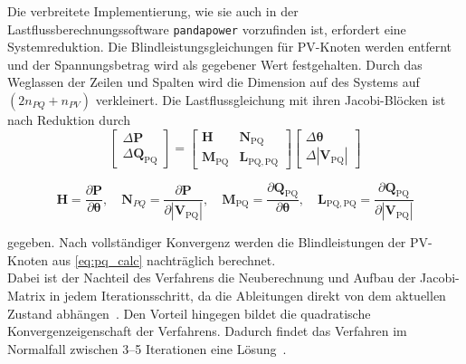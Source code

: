 Die verbreitete Implementierung, wie sie auch in der Lastflussberechnungssoftware \texttt{pandapower} vorzufinden ist, erfordert eine Systemreduktion.
Die Blindleistungsgleichungen für PV-Knoten werden entfernt und der Spannungsbetrag wird als gegebener Wert festgehalten.
Durch das Weglassen der Zeilen und Spalten wird die Dimension auf des Systems auf $(2n_{PQ} + n_{PV})$ verkleinert.
Die Lastflussgleichung mit ihren Jacobi-Blöcken ist nach Reduktion durch
\begin{equation}
	\label{eq:nr_reduziert}
	\begin{bmatrix} \Delta \mathbf{P} \\ \Delta \mathbf{Q}_{\mathrm{PQ}} \end{bmatrix}
	=
	\begin{bmatrix}
		\mathbf{H} & \mathbf{N}_{\mathrm{PQ}} \\
		\mathbf{M}_{\mathrm{PQ}} & \mathbf{L}_{\mathrm{PQ,PQ}}
	\end{bmatrix}
	\begin{bmatrix} \Delta \boldsymbol{\theta} \\ \Delta |\mathbf{V}_{\mathrm{PQ}}|\end{bmatrix}
\end{equation}

\begin{equation}
	\mathbf{H} = \frac{\partial \mathbf{P}}{\partial \boldsymbol{\theta}}, \quad
	\mathbf{N}_{PQ} = \frac{\partial \mathbf{P}}{\partial |\mathbf{V}_{\mathrm{PQ}}|}, \quad
	\mathbf{M}_\mathrm{PQ} = \frac{\partial \mathbf{Q}_{\mathrm{PQ}}}{\partial \boldsymbol{\theta}}, \quad
	\mathbf{L}_{\mathrm{PQ,PQ}} = \frac{\partial \mathbf{Q}_{\mathrm{PQ}}}{\partial |\mathbf{V}_{\mathrm{PQ}}|}
\end{equation}

gegeben.
Nach vollständiger Konvergenz werden die Blindleistungen der PV-Knoten aus \eqref{eq:pq_calc} nachträglich berechnet.\\


Dabei ist der Nachteil des Verfahrens die Neuberechnung und Aufbau der Jacobi-Matrix in jedem Iterationsschritt, da die Ableitungen direkt von dem aktuellen Zustand abhängen~\cite{Davis2006}. 
Den Vorteil hingegen bildet die quadratische Konvergenzeigenschaft der Verfahrens. Dadurch findet das Verfahren im Normalfall zwischen 3--5 Iterationen eine Lösung~\cite{Salazar2024}.


